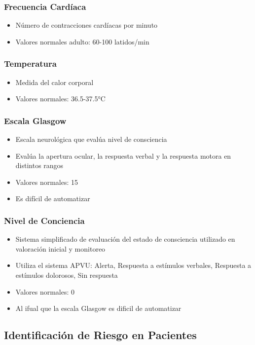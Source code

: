 \subsubsection{Frecuencia Cardíaca}
\begin{itemize}
    \item Número de contracciones cardíacas por minuto
    \item Valores normales adulto: 60-100 latidos/min
\end{itemize}

\subsubsection{Temperatura}
\begin{itemize}
    \item Medida del calor corporal
    \item Valores normales: 36.5-37.5°C
\end{itemize}

\subsubsection{Escala Glasgow}
\begin{itemize}
    \item Escala neurológica que evalúa nivel de consciencia
    \item Evalúa la apertura ocular, la respuesta verbal y la respuesta motora en distintos rangos
    \item Valores normales: 15
    \item Es difícil de automatizar
\end{itemize}

\subsubsection{Nivel de Conciencia}
\begin{itemize}
    \item Sistema simplificado de evaluación del estado de consciencia utilizado en valoración inicial y monitoreo
    \item Utiliza el sistema APVU: Alerta, Respuesta a estímulos verbales, Respuesta a estímulos dolorosos, Sin respuesta
    \item Valores normales: 0
    \item Al ifual que la escala Glasgow es dificil de automatizar
\end{itemize}
\newpage
\subsection{Identificación de Riesgo en Pacientes}

